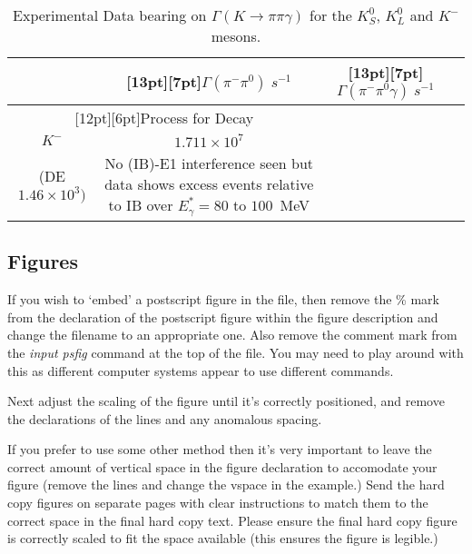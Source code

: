 \begin{table}[t]
\caption{Experimental Data bearing on 
$\Gamma(K \rightarrow \pi \pi \gamma)$
for the $K^0_S$, $K^0_L$ and $K^-$ mesons.\label{tab:exp}}
\vspace{0.2cm}
\begin{center}
\footnotesize
\begin{tabular}{|c|c|c|l|}
\hline
{} &\raisebox{0pt}[13pt][7pt]{$\Gamma(\pi^- \pi^0)\; s^{-1}$} &
\raisebox{0pt}[13pt][7pt]{$\Gamma(\pi^-\pi^0\gamma)\; s^{-1}$} &{}\\
\hline
\multicolumn{2}{|c|}{\raisebox{0pt}[12pt][6pt]{Process 
for Decay}} & &\\
\cline{1-2}
$K^-$   &$1.711 \times 10^7$ 
&\begin{minipage}{1in}
\begin{center}
$2.22 \times 10^4$ \\ (DE $ 1.46 \times 10^3)$
\end{center}
\end{minipage} 
&\begin{minipage}{1.5in}
\phantom{xxx}
No (IB)-E1 interference seen but data shows excess events 
relative to IB over
$E^{\ast}_{\gamma} = 80$ to $100$~MeV
\end{minipage} \\[22pt]
\hline
\end{tabular}
\end{center}
\end{table}

\subsection{Figures}
If you wish to `embed' a postscript figure in the file,
then remove the \% mark from the declaration of the
postscript figure within the figure description and
change the filename to an appropriate one. Also remove
the comment mark from the {\em input psfig} command at
the top of the file. You may need to play around with
this as different computer systems appear to use
different commands.

Next adjust the scaling of the figure until it's
correctly positioned, and remove the declarations of the
lines and any anomalous spacing. 

If you prefer to use some other method then it's very 
important to leave the correct amount of vertical space in 
the figure declaration to accomodate your figure 
(remove the lines and change the vspace in the example.) 
Send the hard copy figures on separate pages with clear
instructions to match them to the correct space in the 
final hard copy text. Please ensure the final hard copy 
figure is correctly scaled to fit the space available (this 
ensures the figure is legible.)

